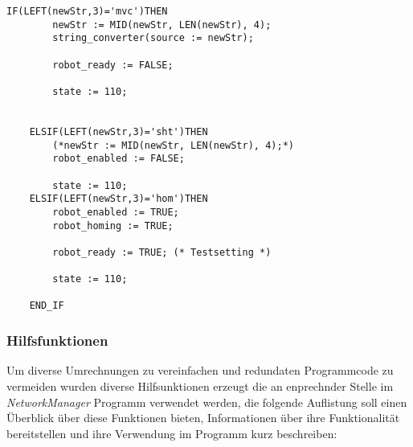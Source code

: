 \begin{lstlisting}[language = codesysls, captionpos=b, caption={Ermittlung der durchzuführenden Operation}]
IF(LEFT(newStr,3)='mvc')THEN
		newStr := MID(newStr, LEN(newStr), 4);
		string_converter(source := newStr);

		robot_ready := FALSE;

		state := 110;


	ELSIF(LEFT(newStr,3)='sht')THEN
		(*newStr := MID(newStr, LEN(newStr), 4);*)
		robot_enabled := FALSE;

		state := 110;
	ELSIF(LEFT(newStr,3)='hom')THEN
		robot_enabled := TRUE;
		robot_homing := TRUE;

		robot_ready := TRUE; (* Testsetting *)

		state := 110;

	END_IF
\end{lstlisting}

\subsubsection{Hilfsfunktionen}
Um diverse Umrechnungen zu vereinfachen und redundaten Programmcode zu vermeiden wurden diverse Hilfsunktionen erzeugt die an enprechnder Stelle im\textit{ NetworkManager} Programm verwendet werden, die folgende Auflistung soll einen Überblick über diese Funktionen bieten, Informationen über ihre Funktionalität bereitstellen und ihre Verwendung im Programm kurz beschreiben:

